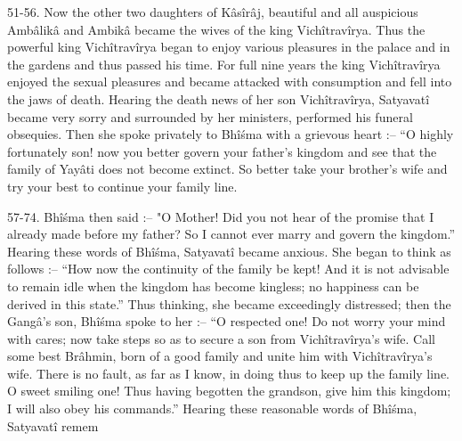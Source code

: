 51-56. Now the other two daughters of K\^as\^ir\^aj, beautiful and all auspicious Amb\^alik\^a and Ambik\^a became the wives of the king Vich\^itrav\^irya. Thus the powerful king Vich\^itrav\^irya began to enjoy various pleasures in the palace and in the gardens and thus passed his time. For full nine years the king Vich\^itrav\^irya enjoyed the sexual pleasures and became attacked with consumption and fell into the jaws of death. Hearing the death news of her son Vich\^itrav\^irya, Satyavat\^i became very sorry and surrounded by her ministers, performed his funeral obsequies. Then she spoke privately to Bh\^i\'sma with a grievous heart :-- ``O highly fortunately son! now you better govern your father's kingdom and see that the family of Yay\^ati does not become extinct. So better take your brother's wife and try your best to continue your family line.

57-74. Bh\^i\'sma then said :-- "O Mother! Did you not hear of the promise that I already made before my father? So I cannot ever marry and govern the kingdom.'' Hearing these words of Bh\^i\'sma, Satyavat\^i became anxious. She began to think as follows :-- ``How now the continuity of the family be kept! And it is not advisable to remain idle when the kingdom has become kingless; no happiness can be derived in this state.'' Thus thinking, she became exceedingly distressed; then the Gang\^a's son, Bh\^i\'sma spoke to her :-- ``O respected one! Do not worry your mind with cares; now take steps so as to secure a son from Vich\^itrav\^irya's wife. Call some best Br\^ahmin, born of a good family and unite him with Vich\^itrav\^irya's wife. There is no fault, as far as I know, in doing thus to keep up the family line. O sweet smiling one! Thus having begotten the grandson, give him this kingdom; I will also obey his commands.'' Hearing these reasonable words of Bh\^i\'sma, Satyavat\^i remem

